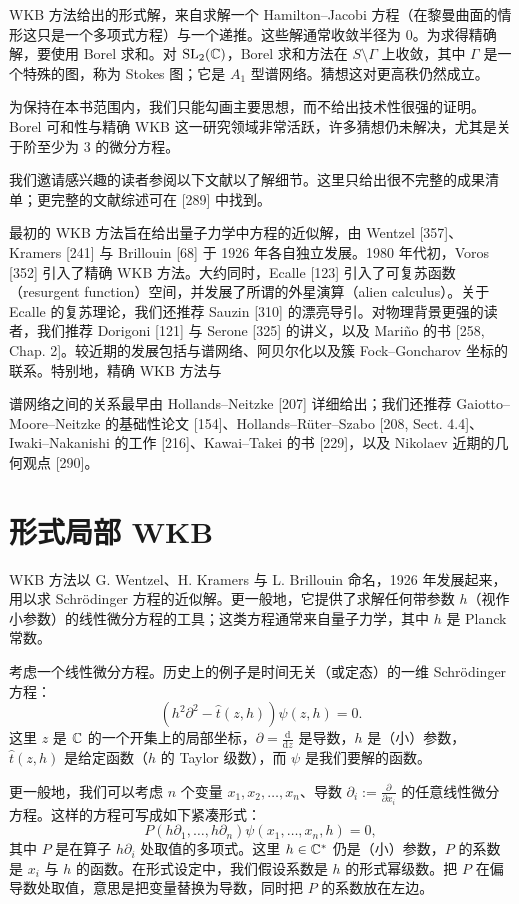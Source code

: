 WKB 方法给出的形式解，来自求解一个 Hamilton–Jacobi 方程（在黎曼曲面的情形这只是一个多项式方程）与一个递推。这些解通常收敛半径为 0。为求得精确解，要使用 Borel 求和。对 $\operatorname{SL}_2(\mathbb{C})$，Borel 求和方法在 $S\setminus\Gamma$ 上收敛，其中 $\Gamma$ 是一个特殊的图，称为 Stokes 图；它是 $A_1$ 型谱网络。猜想这对更高秩仍然成立。

为保持在本书范围内，我们只能勾画主要思想，而不给出技术性很强的证明。Borel 可和性与精确 WKB 这一研究领域非常活跃，许多猜想仍未解决，尤其是关于阶至少为 3 的微分方程。

我们邀请感兴趣的读者参阅以下文献以了解细节。这里只给出很不完整的成果清单；更完整的文献综述可在 [289] 中找到。

最初的 WKB 方法旨在给出量子力学中方程的近似解，由 Wentzel [357]、Kramers [241] 与 Brillouin [68] 于 1926 年各自独立发展。1980 年代初，Voros [352] 引入了精确 WKB 方法。大约同时，Ecalle [123] 引入了可复苏函数（resurgent function）空间，并发展了所谓的外星演算（alien calculus）。关于 Ecalle 的复苏理论，我们还推荐 Sauzin [310] 的漂亮导引。对物理背景更强的读者，我们推荐 Dorigoni [121] 与 Serone [325] 的讲义，以及 Mariño 的书 [258, Chap. 2]。较近期的发展包括与谱网络、阿贝尔化以及簇 Fock–Goncharov 坐标的联系。特别地，精确 WKB 方法与

谱网络之间的关系最早由 Hollands–Neitzke [207] 详细给出；我们还推荐 Gaiotto–Moore–Neitzke 的基础性论文 [154]、Hollands–Rüter–Szabo [208, Sect. 4.4]、Iwaki–Nakanishi 的工作 [216]、Kawai–Takei 的书 [229]，以及 Nikolaev 近期的几何观点 [290]。

\section{形式局部 WKB}

WKB 方法以 G. Wentzel、H. Kramers 与 L. Brillouin 命名，1926 年发展起来，用以求 Schrödinger 方程的近似解。更一般地，它提供了求解任何带参数 $h$（视作小参数）的线性微分方程的工具；这类方程通常来自量子力学，其中 $h$ 是 Planck 常数。

考虑一个线性微分方程。历史上的例子是时间无关（或定态）的一维 Schrödinger 方程：
\begin{equation}
(h^2\partial^2-\hat t(z,h))\psi(z,h)=0.
\tag{16.1}
\end{equation}
这里 $z$ 是 $\mathbb{C}$ 的一个开集上的局部坐标，$\partial=\frac{\mathrm{d}}{\mathrm{d}z}$ 是导数，$h$ 是（小）参数，$\hat t(z,h)$ 是给定函数（$h$ 的 Taylor 级数），而 $\psi$ 是我们要解的函数。

更一般地，我们可以考虑 $n$ 个变量 $x_1,x_2,\dots,x_n$、导数 $\partial_i:=\frac{\partial}{\partial x_i}$ 的任意线性微分方程。这样的方程可写成如下紧凑形式：
\begin{equation}
P(h\partial_1,\dots,h\partial_n)\psi(x_1,\dots,x_n,h)=0,
\tag{16.2}
\end{equation}
其中 $P$ 是在算子 $h\partial_i$ 处取值的多项式。这里 $h\in\mathbb{C}^*$ 仍是（小）参数，$P$ 的系数是 $x_i$ 与 $h$ 的函数。在形式设定中，我们假设系数是 $h$ 的形式幂级数。把 $P$ 在偏导数处取值，意思是把变量替换为导数，同时把 $P$ 的系数放在左边。

